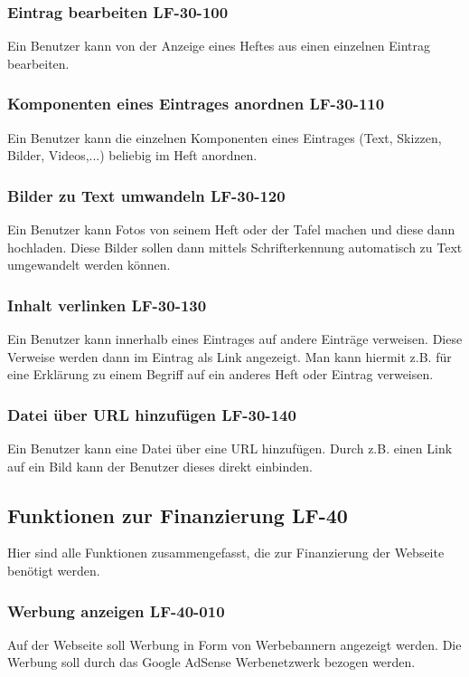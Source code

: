 \documentclass[12pt,a4paper,oneside,ngerman]{scrartcl}
\begin{document}
\subsubsection{Eintrag bearbeiten \hfill LF-30-100}
Ein Benutzer kann von der Anzeige eines Heftes aus einen einzelnen Eintrag bearbeiten.

\subsubsection{Komponenten eines Eintrages anordnen \hfill LF-30-110}
Ein Benutzer kann die einzelnen Komponenten eines Eintrages (Text, Skizzen, Bilder, Videos,...) beliebig im Heft anordnen.

\subsubsection{Bilder zu Text umwandeln \hfill LF-30-120}
Ein Benutzer kann Fotos von seinem Heft oder der Tafel machen und diese dann hochladen. Diese Bilder sollen dann mittels Schrifterkennung automatisch zu Text umgewandelt werden können.

\subsubsection{Inhalt verlinken \hfill LF-30-130}
Ein Benutzer kann innerhalb eines Eintrages auf andere Einträge verweisen. Diese Verweise werden dann im Eintrag als Link angezeigt. Man kann hiermit z.B. für eine Erklärung zu einem Begriff auf ein anderes Heft oder Eintrag verweisen. 

\subsubsection{Datei über URL hinzufügen \hfill LF-30-140}
Ein Benutzer kann eine Datei über eine URL hinzufügen. Durch z.B. einen Link auf ein Bild kann der Benutzer dieses direkt einbinden. 


\subsection[Funktionen zur Finanzierung]{Funktionen zur Finanzierung \hfill LF-40}
Hier sind alle Funktionen zusammengefasst, die zur Finanzierung der Webseite benötigt werden.

\subsubsection{Werbung anzeigen \hfill LF-40-010}
Auf der Webseite soll Werbung in Form von Werbebannern angezeigt werden. Die Werbung soll durch das Google AdSense Werbenetzwerk bezogen werden.
\end{document}
